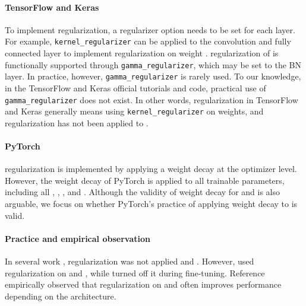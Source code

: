 \documentclass{article}
\begin{document}
\paragraph{TensorFlow and Keras} To implement  regularization, a regularizer option needs to be set for each layer. For example, \texttt{kernel\_regularizer} can be applied to the convolution and fully connected layer to implement  regularization on weight .  regularization of  is functionally supported through \texttt{gamma\_regularizer}, which may be set to the BN layer. In practice, however, \texttt{gamma\_regularizer} is rarely used. To our knowledge, in the TensorFlow and Keras official tutorials and code, practical use of \texttt{gamma\_regularizer} does not exist. In other words,  regularization in TensorFlow and Keras generally means using \texttt{kernel\_regularizer} on weights, and  regularization has not been applied to .
\paragraph{PyTorch}  regularization is implemented by applying a weight decay at the optimizer level. However, the weight decay of PyTorch is applied to all trainable parameters, including all , , , and . Although the validity of weight decay for  and  is also arguable, we focus on whether PyTorch's practice of applying weight decay to  is valid.
\paragraph{Practice and empirical observation} In several work \cite{cvpr/HeZ0ZXL19,corr/abs-1807-11205,gcorr/GoyalDGNWKTJH17},  regularization was not applied  and . However, \cite{ijcv/WuH20,iclr/YanWZ0W020} used  regularization on  and , while \cite{ijcv/WuH20} turned off it during fine-tuning. Reference \cite{iclr/SummersD20} empirically observed that  regularization on  and  often improves performance depending on the architecture.
\end{document}
